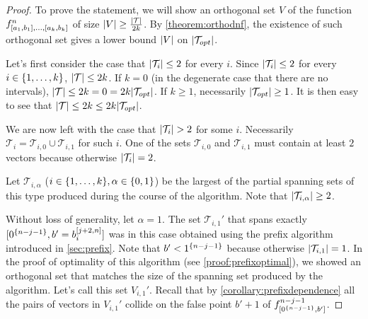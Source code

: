 \begin{proof}
To prove the statement,
we will show an orthogonal set $V$ of the function
$f^n_{[a_1, b_1], \ldots, [a_k, b_k]}$
of size
$\lvert V\rvert \geq \frac{\lvert\mathcal{T}\rvert}{2k}$.
By \cref{theorem:orthodnf},
the existence of such orthogonal set
gives a lower bound $\lvert V\rvert$
on $\lvert\mathcal{T}_{opt}\rvert$.

Let's first consider the case that
$\lvert\mathcal{T}_i\rvert \leq 2$ for every $i$.
Since $\lvert\mathcal{T}_i\rvert \leq 2$
for every $i \in \{1, \ldots, k\}$,
$\lvert\mathcal{T}\rvert \leq 2k$.
If $k = 0$
(in the degenerate case that there are no intervals),
$\lvert\mathcal{T}\rvert \leq 2k = 0
= 2k \lvert\mathcal{T}_{opt}\rvert$.
If $k \geq 1$,
necessarily $\lvert\mathcal{T}_{opt}\rvert \geq 1$.
It is then easy to see that
$\lvert\mathcal{T}\rvert
\leq 2k \leq 2k \lvert\mathcal{T}_{opt}\rvert$.

We are now left with the case that
$\lvert\mathcal{T}_i\rvert > 2$ for some $i$.
Necessarily $\mathcal{T}_i
= \mathcal{T}_{i,0} \cup \mathcal{T}_{i,1}$
for such $i$.
One of the sets
$\mathcal{T}_{i,0}$ and $\mathcal{T}_{i,1}$
must contain at least $2$ vectors
because otherwise $\lvert\mathcal{T}_i\rvert = 2$.

Let $\mathcal{T}_{i, \alpha}$
($i \in \{1, \ldots, k\}, \alpha \in \{0, 1\}$)
be the largest
of the partial spanning sets of this type
produced during the course of the algorithm.
Note that $\lvert\mathcal{T}_{i,\alpha}\rvert \geq 2$.

Without loss of generality,
let $\alpha = 1$.
The set $\mathcal{T}_{i, 1}'$
that spans exactly
$[0^{\{n-j-1\}}, b' = b_i^{[j+2, n]}]$
was in this case obtained
using the prefix algorithm
introduced in \cref{sec:prefix}.
Note that $b' < 1^{\{n-j-1\}}$
because otherwise $\lvert\mathcal{T}_{i,1}\rvert = 1$.
In the proof of optimality of this algorithm
(see \cref{proof:prefixoptimal}),
we showed an orthogonal set that matches the size
of the spanning set produced by the algorithm.
Let's call this set $V_{i, 1}'$.
Recall that by \cref{corollary:prefixdependence}
all the pairs of vectors in $V_{i, 1}'$
collide on the false point $b' + 1$
of $f^{n-j-1}_{[0^{\{n-j-1\}}, b']}$.


\end{proof}

